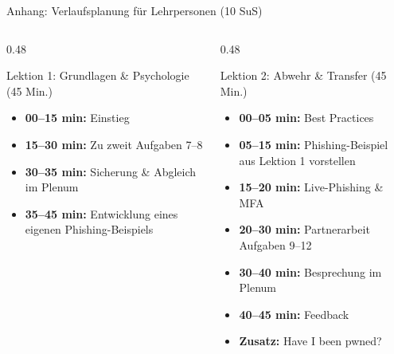 \documentclass[10pt, aspectratio=169]{beamer}
\begin{document}
\appendix
\begin{frame}{Anhang: Verlaufsplanung für Lehrpersonen (10 SuS)}
  \begin{columns}[T]
    \begin{column}{0.48\textwidth}
      \begin{block}{Lektion 1: Grundlagen \& Psychologie (45 Min.)}
        \small
        \begin{itemize}
          \item \textbf{00--15 min:} Einstieg
          \item \textbf{15--30 min:} Zu zweit Aufgaben 7--8
          \item \textbf{30--35 min:} Sicherung \& Abgleich im Plenum
          \item \textbf{35--45 min:} Entwicklung eines eigenen Phishing-Beispiels
        \end{itemize}
      \end{block}
    \end{column}
    \begin{column}{0.48\textwidth}
      \begin{block}{Lektion 2: Abwehr \& Transfer (45 Min.)}
        \small
        \begin{itemize}
          \item \textbf{00--05 min:} Best Practices
          \item \textbf{05--15 min:} Phishing-Beispiel aus Lektion 1 vorstellen 
          \item \textbf{15--20 min:} Live-Phishing \& MFA
          \item \textbf{20--30 min:} Partnerarbeit Aufgaben 9--12
          \item \textbf{30--40 min:} Besprechung im Plenum 
          \item \textbf{40--45 min:} Feedback
          \item \textbf{Zusatz:} Have I been pwned?
        \end{itemize}
      \end{block}
    \end{column}
  \end{columns}
\end{frame}
\end{document}
